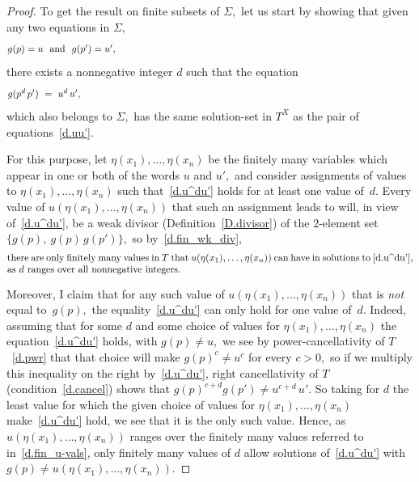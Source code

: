 \documentclass{amsart}
\numberwithin{equation}{section}
\numberwithin{theorem}{section}
\newcommand{\2}{\mathbf{2}}
\begin{document}
\begin{proof}
To get the result on finite subsets of $\Sigma,$
let us start by showing that given any two equations in $\Sigma,$
%
\begin{equation}\begin{minipage}[c]{35pc}\label{d.uu'}
$g(p)=u$ \ and \ $g(p')=u',$
\end{minipage}\end{equation}
%
there exists a nonnegative integer $d$ such that the equation
%
\begin{equation}\begin{minipage}[c]{35pc}\label{d.u^du'}
$g(p^d\,p')\ =\ u^d\,u',$
\end{minipage}\end{equation}
%
which also belongs to $\Sigma,$ has the same solution-set
in $T^X$ as the pair of equations~\eqref{d.uu'}.

For this purpose, let $\eta(x_1),\dots,\eta(x_n)$ be the finitely many
variables which appear in one or both of the words
$u$ and $u',$ and consider
assignments of values to $\eta(x_1),\dots,\eta(x_n)$ such
that~\eqref{d.u^du'} holds for at least one value of~$d.$
Every value of $u(\eta(x_1),\dots,\eta(x_n))$
that such an assignment leads to will, in view of~\eqref{d.u^du'},
be a weak divisor (Definition~\ref{D.divisor})
of the $\!2\!$-element set $\{g(p),\ g(p)\,g(p')\},$
so by~\eqref{d.fin_wk_div},
%
\begin{equation}\begin{minipage}[c]{35pc}\label{d.fin_u-vals}
there are only finitely many values in $T$ that
$u(\eta(x_1),\dots,\eta(x_n))$ can have in solutions
to~\eqref{d.u^du'}, as $d$ ranges over all nonnegative integers.
\end{minipage}\end{equation}

Moreover, I claim that for any such value of
$u(\eta(x_1),\dots,\eta(x_n))$ that is
{\em not} equal to~$g(p),$ the equality~\eqref{d.u^du'} can only
hold for one value of~$d.$
Indeed, assuming that for some $d$ and some
choice of values for $\eta(x_1),\dots,\eta(x_n)$
the equation~\eqref{d.u^du'}
holds, with $g(p)\neq u,$ we see by power-cancellativity
of $T$~\eqref{d.pwr} that %
that choice will make $g(p)^c\neq u^c$ for every $c>0,$ so
if we multiply this inequality on the right by~\eqref{d.u^du'},
right cancellativity of $T$ (condition~\eqref{d.cancel}) shows
that $g(p)^{c+d}g(p')\neq u^{c+d}\,u'.$
So taking for $d$ the least value for which the given
choice of values for $\eta(x_1),\dots,\eta(x_n)$
make~\eqref{d.u^du'} hold, we see that it is the only such value.
Hence, as $u(\eta(x_1),\dots,\eta(x_n))$ ranges over the
finitely many values referred to
in~\eqref{d.fin_u-vals}, only finitely many values of $d$
allow solutions of~\eqref{d.u^du'} with
$g(p)\neq u(\eta(x_1),\dots,\eta(x_n)).$


\end{proof}
\end{document}

